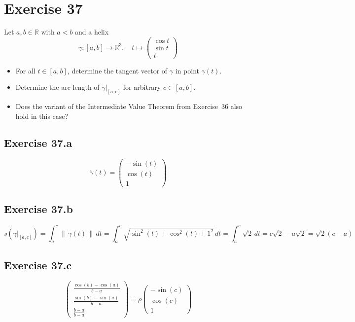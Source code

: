 \documentclass[a4paper]{article}
\theoremstyle{definition}
\newcommand\norm[1]{\left\|\,#1\,\right\|}
\begin{document}
\section{Exercise 37}
\begin{ex}
  Let $a,b \in \mathbb R$ with $a < b$ and a helix
  \[ \gamma: [a,b] \to \mathbb R^3, \quad t \mapsto \begin{pmatrix} \cos{t} \\ \sin{t} \\ t \end{pmatrix} \]
  \begin{itemize}
  \item For all $t \in [a,b]$, determine the tangent vector of $\gamma$ in point $\gamma(t)$.
  \item Determine the arc length of $\gamma\big|_{[a,c]}$ for arbitrary $c \in [a,b]$.
    \item Does the variant of the Intermediate Value Theorem from Exercise~36 also hold in this case?
  \end{itemize}
\end{ex}

\subsection{Exercise 37.a}
\[ \dot{\gamma}(t) = \begin{pmatrix} -\sin(t) \\ \cos(t) \\ 1 \end{pmatrix} \]

\subsection{Exercise 37.b}
\[
s(\gamma|_{[a,c]}) = \int_a^c \norm{\dot{\gamma}(t)} \, dt
= \int_a^c \sqrt{\sin^2(t) + \cos^2(t) + 1^2} \, dt
= \int_a^c \sqrt{2} \, dt = c \sqrt{2} - a \sqrt{2} = \sqrt{2} (c - a)
\]

\subsection{Exercise 37.c}

\[
\begin{pmatrix}
  \frac{\cos(b) - \cos(a)}{b - a} \\
  \frac{\sin(b) - \sin(a)}{b - a} \\
  \frac{b - a}{b - a}
\end{pmatrix} = \rho \begin{pmatrix}
  -\sin(c) \\
  \cos(c) \\
  1
\end{pmatrix}
\]
\end{document}
